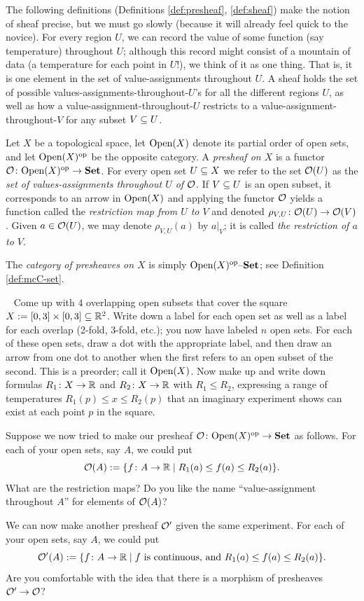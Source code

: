 \documentclass[CT4S-EN-RU]{subfiles}
\begin{document}
The following definitions (Definitions \ref{def:presheaf}, \ref{def:sheaf}) make the notion of sheaf precise, but we must go slowly (because it will already feel quick to the novice). For every region $U$, we can record the value of some function (say temperature) throughout $U$; although this record might consist of a mountain of data (a temperature for each point in $U$!), we think of it as one thing. That is, it is one element in the set of value-assignments throughout $U$. A sheaf holds the set of possible values-assignments-throughout-$U$'s for all the different regions $U$, as well as how a value-assignment-throughout-$U$ restricts to a value-assignment-throughout-$V$ for any subset $V\ss U$.

\begin{definition}\label{def:presheaf}

Let $X$ be a topological space, let $\Op(X)$ denote its partial order of open sets, and let $\Op(X)\op$ be the opposite category. A {\em presheaf on $X$} is a functor $\mcO\taking\Op(X)\op\to\Set$. For every open set $U\ss X$ we refer to the set $\mcO(U)$ as the {\em set of values-assignments throughout $U$ of $\mcO$}. If $V\ss U$ is an open subset, it corresponds to an arrow in $\Op(X)$ and applying the functor $\mcO$ yields a function called the {\em restriction map from $U$ to $V$} and denoted $\rho_{V,U}\taking\mcO(U)\to\mcO(V)$. Given $a\in\mcO(U)$, we may denote $\rho_{V,U}(a)$ by $a|_V$; it is called {\em the restriction of $a$ to $V$}.

The {\em category of presheaves on $X$} is simply $\Op(X)\op\set$; see Definition \ref{def:mcC-set}.

\end{definition}

\begin{exercise}~
\sexc Come up with $4$ overlapping open subsets that cover the square $X:=[0,3]\times[0,3]\ss\RR^2$. Write down a label for each open set as well as a label for each overlap (2-fold, 3-fold, etc.); you now have labeled $n$ open sets. For each of these open sets, draw a dot with the appropriate label, and then draw an arrow from one dot to another when the first refers to an open subset of the second. This is a preorder; call it $\Op(X)$. Now make up and write down formulas $R_1\taking X\to\RR$ and $R_2\taking X\to\RR$ with $R_1\leq R_2$, expressing a range of temperatures $R_1(p)\leq x\leq R_2(p)$ that an imaginary experiment shows can exist at each point $p$ in the square. 
\item Suppose we now tried to make our presheaf $\mcO\taking\Op(X)\op\to\Set$ as follows. For each of your open sets, say $A$, we could put $$\mcO(A):=\{f\taking A\to\RR\|R_1(a)\leq f(a)\leq R_2(a)\}.$$ What are the restriction maps? Do you like the name “value-assignment throughout $A$” for elements of $\mcO(A)$? 
\item We can now make another presheaf $\mcO'$ given the same experiment. For each of your open sets, say $A$, we could put $$\mcO'(A):=\{f\taking A\to\RR\|f\tn{ is continuous, and }R_1(a)\leq f(a)\leq R_2(a)\}.$$ Are you comfortable with the idea that there is a morphism of presheaves $\mcO'\to\mcO$?
\endsexc
\end{exercise}
\end{document}
